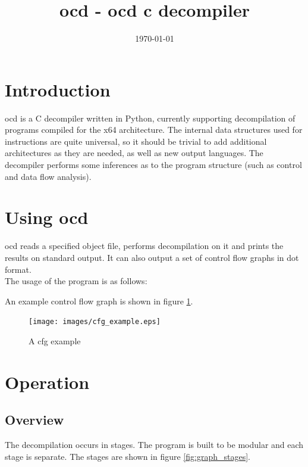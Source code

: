 \documentclass[leqno,11pt]{article}
\title{ocd - ocd c decompiler}
\date{\today}
\begin{document}
\newtheorem{definition}{Definition}
\maketitle

\tableofcontents

\newpage

\section{Introduction}

ocd is a C decompiler written in Python, currently supporting decompilation of programs compiled for the x64 architecture. The internal data structures used for instructions are quite universal, so it should be trivial to add additional architectures as they are needed, as well as new output languages. The decompiler performs some inferences as to the program structure (such as control and data flow analysis).

\section{Using ocd}

ocd reads a specified object file, performs decompilation on it and prints the results on standard output. It can also output a set of control flow graphs in dot format. 
\\ The usage of the program is as follows:



An example control flow graph is shown in figure \ref{fig:cfg_example}.

\begin{figure}[h!]
\texttt{[image: images/cfg\_example.eps]}
\centering
\caption{A cfg example}
\label{fig:cfg_example}
\end{figure}

\section{Operation}

\subsection{Overview}

The decompilation occurs in stages. The program is built to be modular and each stage is separate. The stages are shown in figure \ref{fig:graph_stages}.
\end{document}
